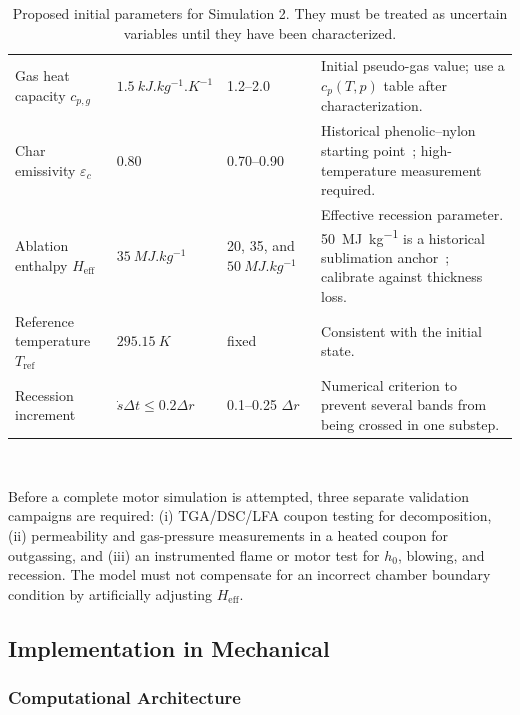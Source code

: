 \documentclass[oneside,openany]{amsdtx}
\begin{document}
\begin{table}[H]
\begin{tabular}{L{0.18\textwidth}M{0.16\textwidth}M{0.18\textwidth}L{0.38\textwidth}}
Gas heat capacity \(c_{p,g}\) & \(\SI{1.5}{kJ.kg^{-1}.K^{-1}}\) & 1.2--2.0 & Initial pseudo-gas value; use a \(c_p(T,p)\) table after characterization. \\
Char emissivity \(\varepsilon_c\) & 0.80 & 0.70--0.90 & Historical phenolic--nylon starting point~\cite{clark1972}; high-temperature measurement required. \\
Ablation enthalpy \(H_\mathrm{eff}\) & \(\SI{35}{MJ.kg^{-1}}\) & 20, 35, and \(\SI{50}{MJ.kg^{-1}}\) & Effective recession parameter. \SI{50}{MJ.kg^{-1}} is a historical sublimation anchor~\cite{clark1972}; calibrate against thickness loss. \\
Reference temperature \(T_\mathrm{ref}\) & \(\SI{295.15}{K}\) & fixed & Consistent with the initial state. \\
Recession increment & \(\dot s\Delta t\le0.2\Delta r\) & 0.1--0.25 \(\Delta r\) & Numerical criterion to prevent several bands from being crossed in one substep. \\
\bottomrule
\end{tabular}~\\[1em]
\caption{Proposed initial parameters for Simulation 2. They must be treated as
uncertain variables until they have been characterized.}
\label{tab:sim2-values}
\end{table}

Before a complete motor simulation is attempted, three separate validation
campaigns are required: (i) \mbox{TGA/DSC/LFA} coupon testing for decomposition,
(ii) permeability and gas-pressure measurements in a heated coupon for
outgassing, and (iii) an instrumented flame or motor test for \(h_0\), blowing,
and recession. The model must not compensate for an incorrect chamber boundary
condition by artificially adjusting \(H_\mathrm{eff}\).

\subsection{Implementation in Mechanical}

\subsubsection{Computational Architecture}
\end{document}
